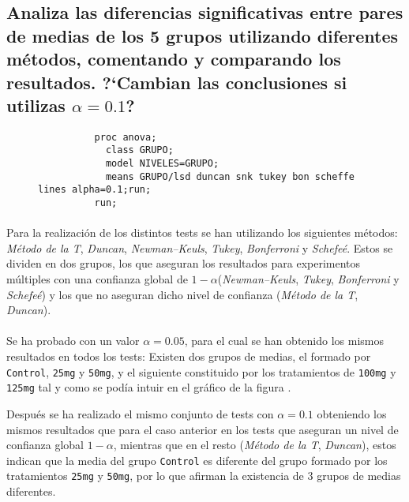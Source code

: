 \documentclass{article}
\begin{document}
    \subsection{Analiza las diferencias significativas entre pares de medias de los 5 grupos utilizando diferentes métodos, comentando y comparando los resultados. ?`Cambian las conclusiones si utilizas $\alpha = 0.1$?}

      \begin{figure}[h]
        \centering
        \begin{verbatim}
          proc anova;
            class GRUPO;
            model NIVELES=GRUPO;
            means GRUPO/lsd duncan snk tukey bon scheffe lines alpha=0.1;run;
          run;
        \end{verbatim}
        \caption{}
        \label{code:sas_5}
      \end{figure}

      \paragraph{}
      Para la realización de los distintos tests se han utilizando los siguientes métodos: \emph{Método de la T}, \emph{Duncan}, \emph{Newman–Keuls}, \emph{Tukey}, \emph{Bonferroni} y \emph{Schefeé}. Estos se dividen en dos grupos, los que aseguran los resultados para experimentos múltiples con una confianza global de $1-\alpha$(\emph{Newman–Keuls}, \emph{Tukey}, \emph{Bonferroni} y \emph{Schefeé}) y los que no aseguran dicho nivel de confianza (\emph{Método de la T}, \emph{Duncan}).

      \paragraph{}
      Se ha probado con un valor $\alpha = 0.05$, para el cual se han obtenido los mismos resultados en todos los tests: Existen dos grupos de medias, el formado por \texttt{Control}, \texttt{25mg} y \texttt{50mg}, y el siguiente constituido por los tratamientos de \texttt{100mg} y \texttt{125mg} tal y como se podía intuir en el gráfico de la figura \label{fig:figura_1}.

      Después se ha realizado el mismo conjunto de tests con $\alpha = 0.1$ obteniendo los mismos resultados que para el caso anterior en los tests que aseguran un nivel de confianza global $1-\alpha$, mientras que en el resto (\emph{Método de la T}, \emph{Duncan}), estos indican que la media del grupo \texttt{Control} es diferente del grupo formado por los tratamientos \texttt{25mg} y \texttt{50mg}, por lo que afirman la existencia de 3 grupos de medias diferentes.
\end{document}

